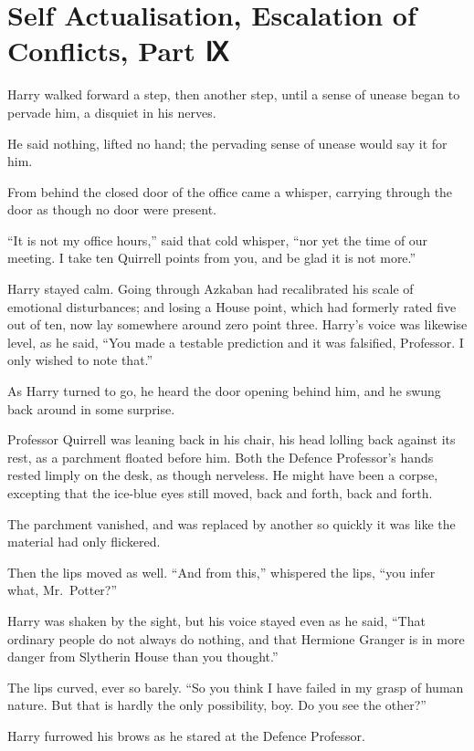 \chapter{Self Actualisation, Escalation of Conflicts, Part
Ⅸ}\label{self-actualisation-escalation-of-conflicts-part}

Harry walked forward a step, then another step, until a sense of unease
began to pervade him, a disquiet in his nerves.

He said nothing, lifted no hand; the pervading sense of unease would say
it for him.

From behind the closed door of the office came a whisper, carrying
through the door as though no door were present.

``It is not my office hours,'' said that cold whisper, ``nor yet the
time of our meeting. I take ten Quirrell points from you, and be glad it
is not more.''

Harry stayed calm. Going through Azkaban had recalibrated his scale of
emotional disturbances; and losing a House point, which had formerly
rated five out of ten, now lay somewhere around zero point three.
Harry's voice was likewise level, as he said, ``You made a testable
prediction and it was falsified, Professor. I only wished to note
that.''

As Harry turned to go, he heard the door opening behind him, and he
swung back around in some surprise.

Professor Quirrell was leaning back in his chair, his head lolling back
against its rest, as a parchment floated before him. Both the Defence
Professor's hands rested limply on the desk, as though nerveless. He
might have been a corpse, excepting that the ice-blue eyes still moved,
back and forth, back and forth.

The parchment vanished, and was replaced by another so quickly it was
like the material had only flickered.

Then the lips moved as well. ``And from this,'' whispered the lips,
``you infer what, Mr.~Potter?''

Harry was shaken by the sight, but his voice stayed even as he said,
``That ordinary people do not always do nothing, and that Hermione
Granger is in more danger from Slytherin House than you thought.''

The lips curved, ever so barely. ``So you think I have failed in my
grasp of human nature. But that is hardly the only possibility, boy. Do
you see the other?''

Harry furrowed his brows as he stared at the Defence Professor.


